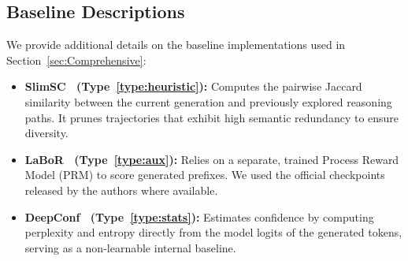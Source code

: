 \documentclass[11pt]{article}
\theoremstyle{plain}
\begin{document}
\subsection{Baseline Descriptions}
\label{app:baselines}
We provide additional details on the baseline implementations used in Section~\ref{sec:Comprehensive}:
\begin{itemize}
    \item \textbf{SlimSC~\cite{hong2025slimsc} (Type~\ref{type:heuristic}):} Computes the pairwise Jaccard similarity between the current generation and previously explored reasoning paths. It prunes trajectories that exhibit high semantic redundancy to ensure diversity.
    \item \textbf{LaBoR~\cite{liao2025lost} (Type~\ref{type:aux}):} Relies on a separate, trained Process Reward Model (PRM) to score generated prefixes. We used the official checkpoints released by the authors where available.
    \item \textbf{DeepConf~\cite{fu2025deepthink} (Type~\ref{type:stats}):} Estimates confidence by computing perplexity and entropy directly from the model logits of the generated tokens, serving as a non-learnable internal baseline.
\end{itemize}



\end{document}
